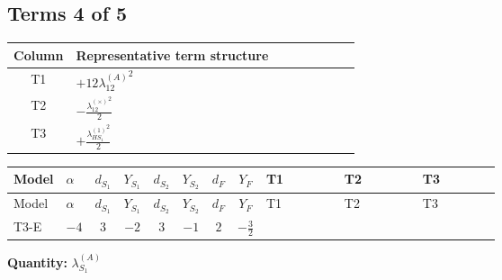 \documentclass[8pt]{article}
\begin{document}
\begin{landscape}
\subsection*{Terms 4 of 5}
\begin{center}
\begin{tabular}{@{}c >{\raggedright\arraybackslash}p{0.82\linewidth}@{}}
\toprule
Column & Representative term structure \\
\midrule
T1 & \(\displaystyle +12 {\lambda_{12}^{(A)}}^2\) \\
\midrule
T2 & \(\displaystyle -\frac{{\lambda_{12}^{(\times)}}^2}{2}\) \\
\midrule
T3 & \(\displaystyle +\frac{{\lambda_{HS_1}^{(1)}}^2}{2}\) \\
\midrule
\bottomrule
\end{tabular}
\end{center}
\smallskip
\tiny
\begin{longtable}{@{}llcccccc >{\raggedright\arraybackslash}p{0.21\linewidth} >{\raggedright\arraybackslash}p{0.21\linewidth} >{\raggedright\arraybackslash}p{0.21\linewidth}@{}}
\toprule
Model & $\alpha$ & $d_{S_1}$ & $Y_{S_1}$ & $d_{S_2}$ & $Y_{S_2}$ & $d_F$ & $Y_F$ & T1 & T2 & T3 \\
\midrule
\endfirsthead
\toprule
Model & $\alpha$ & $d_{S_1}$ & $Y_{S_1}$ & $d_{S_2}$ & $Y_{S_2}$ & $d_F$ & $Y_F$ & T1 & T2 & T3 \\
\midrule
\endhead
T3-E & $-4$ & $3$ & $-2$ & $3$ & $-1$ & $2$ & $-\frac{3}{2}$ & \scriptsize\adjustbox{max width=\linewidth}{$\begin{gathered} +12 {\lambda_{12}^{(A)}}^2\end{gathered}$} & \scriptsize\adjustbox{max width=\linewidth}{$\begin{gathered} -\frac{{\lambda_{12}^{(\times)}}^2}{2}\end{gathered}$} & \scriptsize\adjustbox{max width=\linewidth}{$\begin{gathered} +\frac{{\lambda_{HS_1}^{(1)}}^2}{2}\end{gathered}$} \\
\midrule
\bottomrule
\end{longtable}
\clearpage
\noindent\textbf{Quantity: }$\lambda_{S_1}^{(A)}$\par\smallskip

\end{landscape}
\end{document}
